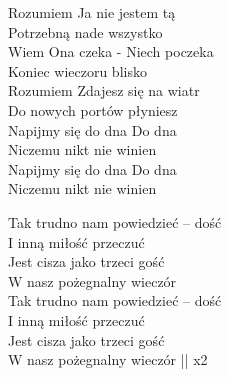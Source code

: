 \begin{text}
\begin{tinyTwelve}
    \hfill\break
    \hfill\break
    \hfill\break
    \hfill\break
Rozumiem Ja nie jestem tą \\
Potrzebną nade wszystko \\
Wiem Ona czeka - Niech poczeka \\
Koniec wieczoru blisko \\
Rozumiem Zdajesz się na wiatr \\
Do nowych portów płyniesz \\
Napijmy się do dna Do dna \\
Niczemu nikt nie winien \\
Napijmy się do dna Do dna\\
Niczemu nikt nie winien

\vin Tak trudno nam powiedzieć – dość \\
\vin I inną miłość przeczuć \\
\vin Jest cisza jako trzeci gość \\
\vin W nasz pożegnalny wieczór \\
\vin Tak trudno nam powiedzieć – dość \\
\vin I inną miłość przeczuć \\
\vin Jest cisza jako trzeci gość \\
\vin W nasz pożegnalny wieczór || x2
\end{tinyTwelve}
\end{text}
